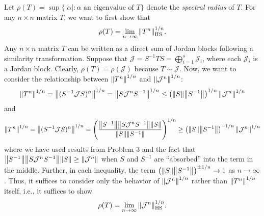 \documentclass[11pt]{article}
\begin{document}
Let $\rho(T) = \sup \{|\alpha| : \alpha\text{ an eigenvalue of  } T\}$ denote the \textit{spectral radius} of $T$. For any $n\times n $ matrix $T$, we want to first show that
\begin{align*}
\rho(T) = \lim\limits_{n\to \infty} \norm{T^n}^{1/n}_{\text{HS}}.
\end{align*}
Any $n\times n$ matrix $T$ can be written as a direct sum of Jordan blocks following a similarity transformation. Suppose that $\mathcal{J} = S^{-1}TS = \bigoplus^s_{i=1}\mathcal{J}_i$, where each $\mathcal{J}_i$ is a Jordan block. Clearly, $\rho(T) = \rho(\mathcal{J})$ because $T\sim \mathcal{J}$. Now, we want to consider the relationship between $\norm{T^n}^{1/n}$ and $\norm{\mathcal{J}^n}^{1/n}$:
\begin{align*}
\norm{T^n}^{1/n} = \norm{(S^{-1}\mathcal{J}S)^n}^{1/n} = \norm{ S \mathcal{J}^n S^{-1}}^{1/n} \leq \left( \norm{S} \norm{S^{-1}}\right)^{1/n} \norm{\mathcal{J}^n}^{1/n}  
\end{align*} 
and
\begin{align*}
\norm{T^n}^{1/n} = \norm{(S^{-1}\mathcal{J}S)^n}^{1/n} = \left( \frac{\norm{S^{-1}}\norm{ S\mathcal{J}^{n}S^{-1}} \norm{S}}{\norm{S} \norm{S^{-1}}}\right)^{1/n} \geq \left( \norm{S} \norm{S^{-1}}\right)^{-1/n} \norm{\mathcal{J}^n}^{1/n} 
\end{align*}
where we have used results from Problem 3 and the fact that $\norm{S^{-1}}\norm{S\mathcal{J}^nS^{-1}}\norm{S} \geq \norm{\mathcal{J}^n}$ when $S$ and $S^{-1}$ are ``absorbed'' into the term in the middle. Further, in each inequality, the term $\left( \norm{S} \norm{S^{-1}}\right)^{\pm 1/n}  \to 1 $  as $n\to \infty$. Thus, it suffices to consider only the behavior of $\norm{\mathcal{J}^n}^{1/n}$ rather than $\norm{T^n}^{1/n}$ itself, i.e., it suffices to show 
\begin{align*}
\rho(T) = \lim\limits_{n\to \infty} \norm{\mathcal{J}^n}^{1/n}_{\text{HS}}.
\end{align*}
\end{document}

